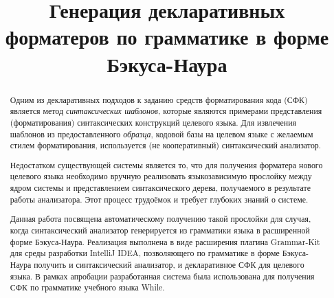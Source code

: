 \documentclass[conference]{IEEEtran}
\begin{document}
%
%
\title{Генерация декларативных форматеров по грамматике в форме Бэкуса-Наура}


\author{
\and
{}
}

\maketitle

\begin{abstract}
Одним из декларативных подходов к заданию средств форматирования кода (СФК)
является метод \emph{синтаксических шаблонов}, которые
являются примерами представления (форматирования) синтаксических
конструкций целевого языка.
Для извлечения шаблонов из предоставленного \emph{образца},
кодовой базы на целевом языке с желаемым стилем форматирования,
используется (не кооперативный) синтаксический анализатор. 

Недостатком существующей системы является то, что 
для получения форматера нового целевого языка
необходимо вручную реализовать языкозависимую прослойку между ядром
системы и представлением синтаксического
дерева, получаемого в результате работы анализатора.
Этот процесс трудоёмок и требует глубоких знаний о системе.


Данная работа посвящена автоматическому получению такой прослойки
для случая, когда синтаксический анализатор генерируется
из грамматики языка в
расширенной форме Бэкуса-Наура.
Реализация выполнена в виде расширения плагина Grammar-Kit
для среды разработки IntelliJ IDEA, позволяющего
по грамматике в форме Бэкуса-Наура получить и синтаксический анализатор,
и декларативное СФК для целевого языка.
В рамках апробации разработанная система была использована
для получения СФК по грамматике учебного языка While.
\end{abstract}
\end{document}
